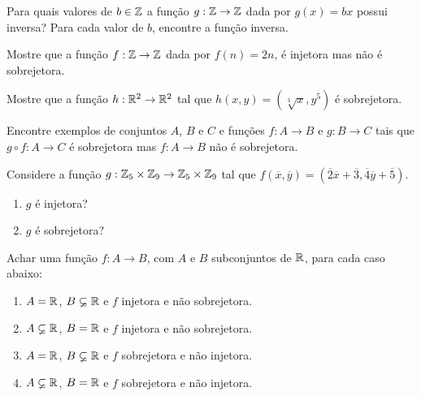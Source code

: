 \documentclass[12pt]{exam}
\begin{document}
    \vspace{.3cm}

    \questao{} Para quais valores de $b \in \mathbb{Z}$ a função $g : \mathbb{Z} \to \mathbb{Z}$ dada por $g(x) = bx$ possui inversa? Para cada valor de $b$, encontre a função inversa.

    \vspace{.3cm}

    \questao{} Mostre que a fun\c{c}\~ao $f : \mathbb{Z} \to \mathbb{Z}$ dada por $f(n) = 2n$, \'e injetora mas n\~ao \'e sobrejetora.

    \vspace{.3cm}

    \questao{} Mostre que a fun\c{c}\~ao $h : \mathbb{R}^2 \to \mathbb{R}^2$ tal que $h(x, y) = (\sqrt[3]{x}, y^5)$ \'e sobrejetora.

    \newpage

    \questao{} Encontre exemplos de conjuntos $A$, $B$ e $C$ e funções $f : A \to B$ e $g : B \to C$ tais que $g \circ f : A \to C$ é sobrejetora mas $f : A \to B$ não é sobrejetora.

    \vspace{.3cm}

    \questao{} Considere a fun{\c c}{\~a}o $g : \mathbb{Z}_5 \times \mathbb{Z}_9 \to \mathbb{Z}_5 \times \mathbb{Z}_9$ tal que $f(\overline{x},\overline{y}) = (\overline{2} \overline{x} + \overline{3}, \overline{4}\overline{y} + \overline{5})$.
    \begin{enumerate}[label={\alph*})]
        \item $g$ \'e injetora?
        \item $g$ \'e sobrejetora?
    \end{enumerate}

    \vspace{.3cm}

    \questao{} Achar uma fun{\c c}{\~a}o $f : A \to B$, com $A$ e $B$ subconjuntos de $\mathbb{R}$, para cada caso abaixo:
    \begin{enumerate}[label={\alph*})]
        \item $A = \mathbb{R}$, $B \varsubsetneq \mathbb{R}$ e $f$ injetora e n{\~a}o sobrejetora.
        \item $A \varsubsetneq \mathbb{R}$, $B = \mathbb{R}$ e $f$ injetora e n{\~a}o sobrejetora.
        \item $A = \mathbb{R}$, $B \varsubsetneq \mathbb{R}$ e $f$ sobrejetora e n{\~a}o injetora.
        \item $A \varsubsetneq \mathbb{R}$, $B = \mathbb{R}$ e $f$ sobrejetora e n{\~a}o injetora.
    \end{enumerate}
\end{document}
